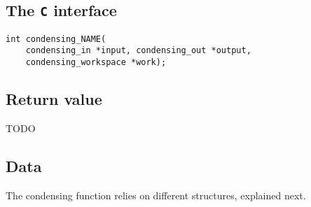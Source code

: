 \documentclass{report}
\begin{document}
\subsection{The \texttt{C} interface}
\begin{verbatim}
int condensing_NAME(
    condensing_in *input, condensing_out *output, 
    condensing_workspace *work);
\end{verbatim}

\subsection{Return value}
TODO

\subsection{Data}
The condensing function relies on different structures, explained next.
\end{document}
